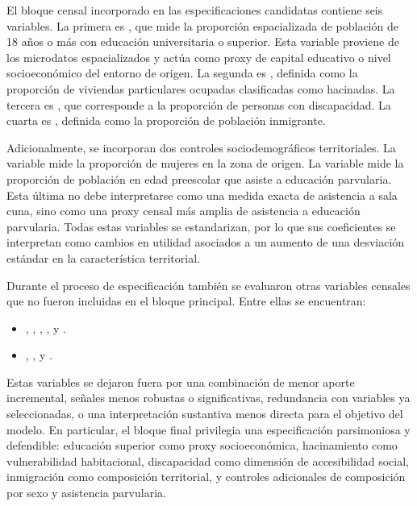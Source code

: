 El bloque censal incorporado en las especificaciones candidatas contiene seis variables. La primera es , que mide la proporción espacializada de población de 18 años o más con educación universitaria o superior. Esta variable proviene de los microdatos espacializados y actúa como proxy de capital educativo o nivel socioeconómico del entorno de origen. La segunda es , definida como la proporción de viviendas particulares ocupadas clasificadas como hacinadas. La tercera es , que corresponde a la proporción de personas con discapacidad. La cuarta es , definida como la proporción de población inmigrante.

Adicionalmente, se incorporan dos controles sociodemográficos territoriales. La variable  mide la proporción de mujeres en la zona de origen. La variable  mide la proporción de población en edad preescolar que asiste a educación parvularia. Esta última no debe interpretarse como una medida exacta de asistencia a sala cuna, sino como una proxy censal más amplia de asistencia a educación parvularia. Todas estas variables se estandarizan, por lo que sus coeficientes se interpretan como cambios en utilidad asociados a un aumento de una desviación estándar en la característica territorial.

Durante el proceso de especificación también se evaluaron otras variables censales que no fueron incluidas en el bloque principal. Entre ellas se encuentran:

\begin{itemize}
    \item {}, , , ,  y .
    \item {}, ,  y .
\end{itemize}

Estas variables se dejaron fuera por una combinación de menor aporte incremental, señales menos robustas o significativas, redundancia con variables ya seleccionadas, o una interpretación sustantiva menos directa para el objetivo del modelo. En particular, el bloque final privilegia una especificación parsimoniosa y defendible: educación superior como proxy socioeconómica, hacinamiento como vulnerabilidad habitacional, discapacidad como dimensión de accesibilidad social, inmigración como composición territorial, y controles adicionales de composición por sexo y asistencia parvularia.

